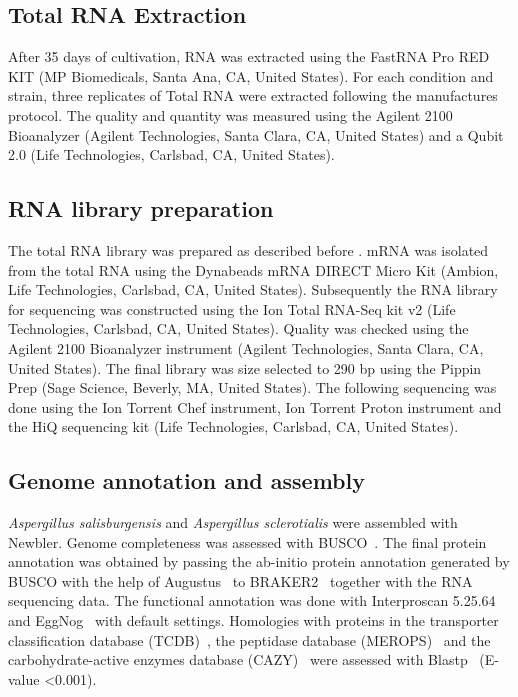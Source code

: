 \documentclass[jof,article,submit,moreauthors,pdftex,10pt,a4paper]{Definitions/mdpi}
\newcommand{\phiSp}{\textit{Aspergillus salisburgensis}}
\newcommand{\phiScl}{\textit{Aspergillus sclerotialis}}
\begin{document}
\subsection{Total RNA Extraction}
After 35 days of cultivation, RNA was extracted using the FastRNA Pro RED KIT (MP Biomedicals, Santa Ana, CA, United States). For each condition and strain, three replicates of Total RNA were extracted following the manufactures protocol.
The quality and quantity was measured using the Agilent 2100 Bioanalyzer (Agilent Technologies, Santa Clara, CA, United States) and a Qubit 2.0 (Life Technologies, Carlsbad, CA, United States). 
\subsection{RNA library preparation}
The total RNA library was prepared as described before \cite{Poyntner2016}. mRNA was isolated from the total RNA using the Dynabeads mRNA DIRECT Micro Kit (Ambion,  Life Technologies, Carlsbad, CA, United States). Subsequently the RNA library for sequencing was constructed using the Ion Total RNA-Seq kit v2 (Life Technologies, Carlsbad, CA, United States). Quality was checked using the Agilent 2100 Bioanalyzer instrument (Agilent Technologies, Santa Clara, CA, United States). The final library was size selected to 290 bp using the Pippin Prep (Sage Science, Beverly, MA, United States). The following sequencing was done using the Ion Torrent Chef instrument, Ion Torrent Proton instrument and the HiQ sequencing kit (Life Technologies, Carlsbad, CA, United States). 

\subsection{Genome annotation and assembly}
\phiSp{} and \phiScl{} were assembled with Newbler. Genome completeness was assessed with BUSCO~\cite{Simao2015}. The final protein annotation was obtained by passing the ab-initio protein annotation generated by BUSCO with the help of Augustus~\cite{Stanke2006} to BRAKER2~\cite{Hoff2016,Lomsadze2014} together with the RNA sequencing data. The functional annotation was done with Interproscan 5.25.64~\cite{Finn2017} and EggNog~\cite{HuertaCepas2016} with default settings.  Homologies with proteins in the transporter classification database (TCDB)~\cite{Saier2006a}, the peptidase database (MEROPS)~\cite{Rawlings2014} and the carbohydrate-active enzymes database (CAZY)~\cite{Cantarel2009} were assessed with Blastp~\cite{Altschul1997} (E-value <0.001). 
\end{document}

